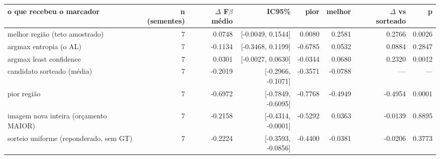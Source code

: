 \begin{adjustbox}{max width=\linewidth}
\begin{tabular}{lrrrrrrr}
\toprule
o que recebeu o marcador & n (sementes) & $\Delta$ F$\beta$ médio & IC95\% & pior & melhor & $\Delta$ vs sorteado & p \\
\midrule
melhor região (teto amostrado) & 7 & 0.0748 & [-0.0049, 0.1544] & 0.0080 & 0.2581 & 0.2766 & 0.0026 \\
argmax entropia (o AL) & 7 & -0.1134 & [-0.3468, 0.1199] & -0.6785 & 0.0532 & 0.0884 & 0.2847 \\
argmax least confidence & 7 & 0.0301 & [-0.0027, 0.0630] & -0.0344 & 0.0680 & 0.2320 & 0.0012 \\
candidato sorteado (média) & 7 & -0.2019 & [-0.2966, -0.1071] & -0.3571 & -0.0788 & --- & --- \\
pior região & 7 & -0.6972 & [-0.7849, -0.6095] & -0.7768 & -0.4949 & -0.4954 & 0.0001 \\
imagem nova inteira (orçamento MAIOR) & 7 & -0.2158 & [-0.4314, -0.0001] & -0.5292 & 0.0363 & -0.0139 & 0.8895 \\
sorteio uniforme (reponderado, sem GT) & 7 & -0.2224 & [-0.3593, -0.0856] & -0.4400 & -0.0381 & -0.0206 & 0.3773 \\
\bottomrule
\end{tabular}
\end{adjustbox}
